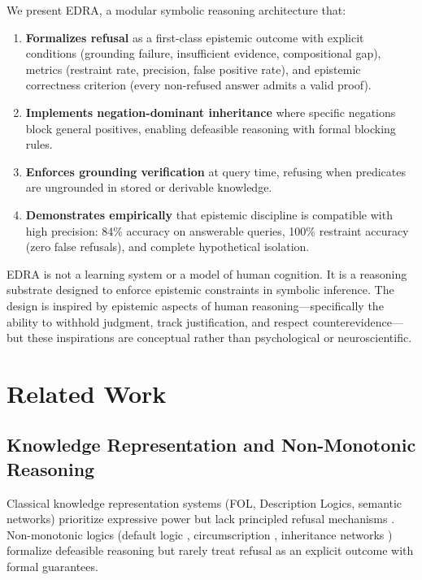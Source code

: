 \documentclass[11pt]{article}
\begin{document}
We present EDRA, a modular symbolic reasoning architecture that:

\begin{enumerate}
    \item \textbf{Formalizes refusal} as a first-class epistemic outcome with explicit conditions (grounding failure, insufficient evidence, compositional gap), metrics (restraint rate, precision, false positive rate), and epistemic correctness criterion (every non-refused answer admits a valid proof).
    
    \item \textbf{Implements negation-dominant inheritance} where specific negations block general positives, enabling defeasible reasoning with formal blocking rules.
    
    \item \textbf{Enforces grounding verification} at query time, refusing when predicates are ungrounded in stored or derivable knowledge.
    
    \item \textbf{Demonstrates empirically} that epistemic discipline is compatible with high precision: 84\% accuracy on answerable queries, 100\% restraint accuracy (zero false refusals), and complete hypothetical isolation.
\end{enumerate}

EDRA is not a learning system or a model of human cognition. It is a reasoning substrate designed to enforce epistemic constraints in symbolic inference. The design is inspired by epistemic aspects of human reasoning—specifically the ability to withhold judgment, track justification, and respect counterevidence—but these inspirations are conceptual rather than psychological or neuroscientific.

\section{Related Work}

\subsection{Knowledge Representation and Non-Monotonic Reasoning}

Classical knowledge representation systems (FOL, Description Logics, semantic networks) prioritize expressive power but lack principled refusal mechanisms \cite{russell2010artificial,baader2003description}. Non-monotonic logics (default logic \cite{reiter1980logic}, circumscription \cite{mccarthy1980circumscription}, inheritance networks \cite{touretzky1986semantics}) formalize defeasible reasoning but rarely treat refusal as an explicit outcome with formal guarantees.
\end{document}
